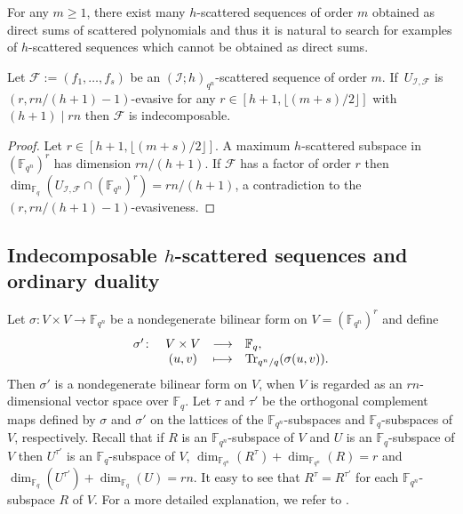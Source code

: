 For any $m\geq 1$, there exist many $h$-scattered sequences of order $m$ obtained as direct sums of scattered polynomials and thus it is  natural to search for examples of $h$-scattered sequences which cannot be obtained as direct sums. 

\begin{lemma}\label{Lemma:ind}
Let  $\mathcal{F}:=(f_1,\ldots,f_s)$ be an  $(\mathcal I;h)_{q^n}$-scattered sequence of order $m$. If~$U_{\mathcal I,\mathcal{F}}$ is $(r,rn/(h+1)-1)$-evasive for any $r\in [h+1,\lfloor (m+s)/2\rfloor ]$ with $(h+1)\mid rn$ then $\mathcal{F}$ is indecomposable.
\end{lemma}
\begin{proof}
Let $r\in [h+1,\lfloor (m+s)/2\rfloor ]$. A maximum $h$-scattered subspace in $(\mathbb{F}_{q^n})^{r}$ has dimension $rn/(h+1)$. If $\mathcal{F}$ has a factor of   order $r$ then $\dim_{\mathbb{F}_q}(U_{\mathcal I,\mathcal{F}}\cap (\mathbb{F}_{q^n})^{r})=rn/(h+1)$, a contradiction to the   $(r,rn/(h+1)-1)$-evasiveness. 
\end{proof}

\subsection{Indecomposable \texorpdfstring{$h$}{h}-scattered sequences and ordinary duality}

Let \mbox{$\sigma\colon V\times V\longrightarrow {\mathbb F}_{q^n}$} be a nondegenerate
	bilinear form on $V=(\mathbb{F}_{q^n})^{r}$ and define
	\[ \begin{array}{rccl}
		\sigma' \colon & V\times V &\longrightarrow & \mathbb{F}_q,\\
       &({u}, { v}) 	& \longmapsto &	{\rm Tr}_{q^n/q}(\sigma({u}, {v})).
	\end{array} \]
	Then $\sigma'$ is a nondegenerate bilinear form on
	$V$, when $V$ is  regarded as an $rn$-dimensional vector space  over
	$\mathbb{F}_q$. Let $\tau$ and $\tau'$ be the orthogonal complement maps
	defined by $\sigma$ and $\sigma'$ on the lattices  of the
	$\mathbb{F}_{q^n}$-subspaces and $\mathbb{F}_q$-subspaces of $V$, respectively.
	Recall that  if $R$ is an
	${\mathbb F}_{q^n}$-subspace of $V$ and $U$ is an $\mathbb{F}_q$-subspace of $V$
	then $U^{\tau'}$ is an $\mathbb{F}_q$-subspace of $V$, $\dim_{{\mathbb F}_{q^n}}(R^\tau)+\dim_{{\mathbb F}_{q^n}}(R)=r$ and
	$\dim_{\mathbb{F}_q} (U^{\tau'})+\dim_{\mathbb{F}_q} (U)= rn$. It easy to see
	that $R^\tau=R^{\tau'}$ for each ${\mathbb F}_{q^n}$-subspace $R$ of $V$. For a more detailed explanation, we refer to \cite[Chapter 7]{taylor1992geometry}.
	
